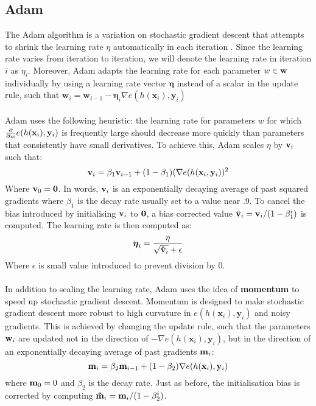 \subsection{Adam}
\label{adam}
The Adam algorithm is a variation on stochastic gradient descent that attempts to shrink the learning rate $\eta$ automatically in each iteration \citep{kingma2014}. Since the learning rate varies from iteration to iteration, we will denote the learning rate in iteration $i$ as $\eta_i$. Moreover, Adam adapts the learning rate for each parameter $w \in \mathbf{w}$ individually by using a learning rate vector $\boldsymbol{\eta}$ instead of a scalar in the update rule, such that $\mathbf{w}_i = \mathbf{w}_{i-1} - \boldsymbol{\eta}_i\nabla e(h(\mathbf{x}_i), \mathbf{y}_i)$
\\\\
Adam uses the following heuristic: the learning rate for parameters $w$ for which $\frac{\partial }{\partial w} e(h(\mathbf{x}_i), \mathbf{y}_i)$ is frequently large should decrease more quickly than parameters that consistently have small derivatives. To achieve this, Adam scales $\eta$ by $\mathbf{v}_i$ such that:
$$ 
\mathbf{v}_i = \beta_1 \mathbf{v}_{i - 1} + (1 - \beta_1)(\nabla e(h(\mathbf{x}_i, \mathbf{y}_i))^2
$$
Where $\mathbf{v}_0 = \mathbf{0}$. In words, $\mathbf{v}_i$ is an exponentially decaying average of past squared gradients where $\beta_1$ is the decay rate usually set to a value near $.9$. To cancel the bias introduced by initialising $\mathbf{v}_i$ to $\mathbf{0}$, a bias corrected value $\hat{\mathbf{v}}_i = \mathbf{v}_i / (1 - \beta_1^i)$ is computed. The learning rate is then computed as:
$$
\boldsymbol{\eta}_i = \frac{\eta}{\sqrt{{\mathbf{\hat{v}}_i}} + \epsilon}
$$
Where $\epsilon$ is small value introduced to prevent division by 0.
\\\\
In addition to scaling the learning rate, Adam uses the idea of \textbf{momentum} to speed up stochastic gradient descent. Momentum is designed to make stochastic gradient descent more robust to high curvature in $e(h(\mathbf{x}_i), \mathbf{y}_i)$ and noisy gradients. This is achieved by changing the update rule, such that the parameters $\mathbf{w}_i$ are updated not in the direction of $-\nabla e(h(\mathbf{x}_i), \mathbf{y}_i)$, but in the direction of an exponentially decaying average of past gradients $\mathbf{m}_i$:
$$
\mathbf{m}_i = \beta_2 \mathbf{m}_{i - 1} + (1 - \beta_2)\nabla e(h(\mathbf{x}_i), \mathbf{y}_i)
$$
where $\mathbf{m}_0 = 0$ and $\beta_2$ is the decay rate. Just as before, the initialisation bias is corrected by computing $\mathbf{\hat{m}}_i = \mathbf{m}_i / (1 - \beta_2^i)$.

